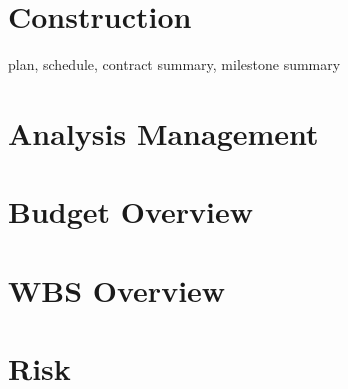 \documentclass[preprint]{aastex}
\begin{document}
\section{Construction}
plan, schedule, contract summary, milestone summary

\section{Analysis Management}

\section{Budget Overview}

\section{WBS Overview}

\section{Risk}
\end{document}
